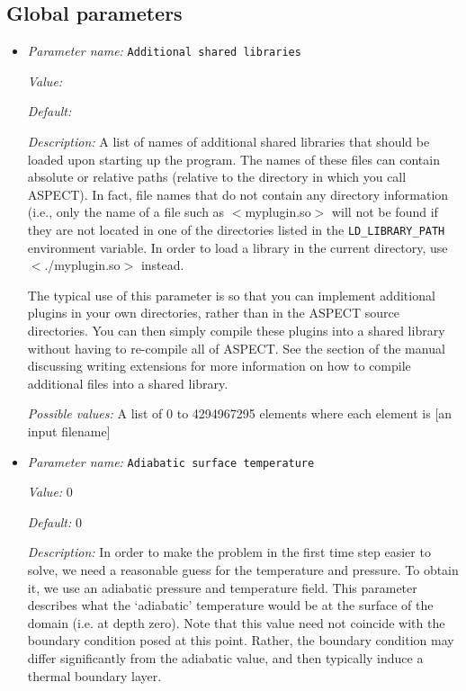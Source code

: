 \subsection{Global parameters}
\label{parameters:global}


\begin{itemize}
\item {\it Parameter name:} {\tt Additional shared libraries}
\label{parameters:Additional shared libraries}


{\it Value:} 


{\it Default:} 


{\it Description:} A list of names of additional shared libraries that should be loaded upon starting up the program. The names of these files can contain absolute or relative paths (relative to the directory in which you call ASPECT). In fact, file names that do not contain any directory information (i.e., only the name of a file such as $<$myplugin.so$>$ will not be found if they are not located in one of the directories listed in the \texttt{LD\_LIBRARY\_PATH} environment variable. In order to load a library in the current directory, use $<$./myplugin.so$>$ instead.

The typical use of this parameter is so that you can implement additional plugins in your own directories, rather than in the ASPECT source directories. You can then simply compile these plugins into a shared library without having to re-compile all of ASPECT. See the section of the manual discussing writing extensions for more information on how to compile additional files into a shared library.


{\it Possible values:} A list of 0 to 4294967295 elements where each element is [an input filename]
\item {\it Parameter name:} {\tt Adiabatic surface temperature}
\label{parameters:Adiabatic surface temperature}


{\it Value:} 0


{\it Default:} 0


{\it Description:} In order to make the problem in the first time step easier to solve, we need a reasonable guess for the temperature and pressure. To obtain it, we use an adiabatic pressure and temperature field. This parameter describes what the `adiabatic' temperature would be at the surface of the domain (i.e. at depth zero). Note that this value need not coincide with the boundary condition posed at this point. Rather, the boundary condition may differ significantly from the adiabatic value, and then typically induce a thermal boundary layer.


\end{itemize}

